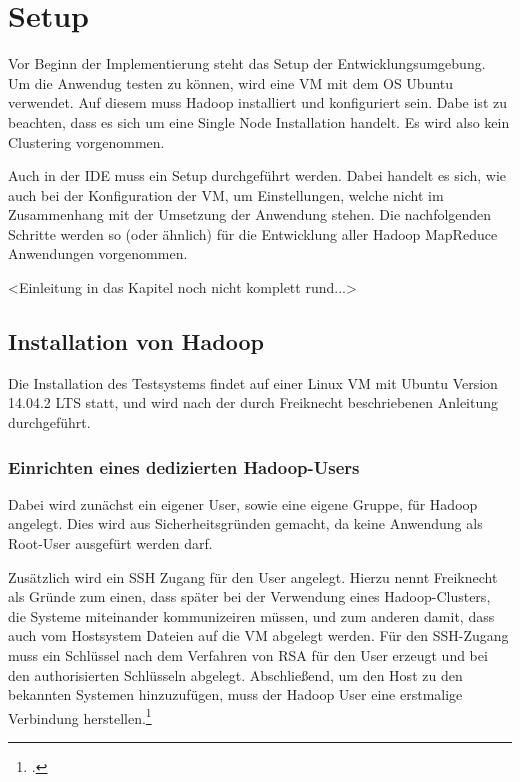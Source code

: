 
\chapter{Setup}\label{cha:Setup}
Vor Beginn der Implementierung steht das Setup der Entwicklungsumgebung. Um die Anwendug testen zu können, wird eine \ac{VM} mit dem \ac{OS} Ubuntu verwendet. Auf diesem muss Hadoop installiert und konfiguriert sein. Dabe ist zu beachten, dass es sich um eine Single Node Installation handelt. Es wird also kein Clustering vorgenommen.

Auch in der \ac{IDE} muss ein Setup durchgeführt werden. Dabei handelt es sich, wie auch bei der Konfiguration der \ac{VM}, um Einstellungen, welche nicht im Zusammenhang mit der Umsetzung der Anwendung stehen. Die nachfolgenden Schritte werden so (oder ähnlich) für die Entwicklung aller Hadoop MapReduce Anwendungen vorgenommen.

<Einleitung in das Kapitel noch nicht komplett rund...>

\section{Installation von Hadoop}\label{sec:InstallationHadoop}
Die Installation des Testsystems findet auf einer Linux \ac{VM} mit Ubuntu Version 14.04.2 \ac{LTS} statt, und wird nach der durch Freiknecht beschriebenen Anleitung durchgeführt. 

\subsection{Einrichten eines dedizierten Hadoop-Users}
Dabei wird zunächst ein eigener User, sowie eine eigene Gruppe, für Hadoop angelegt. Dies wird aus Sicherheitsgründen gemacht, da keine Anwendung als Root-User ausgefürt werden darf.

Zusätzlich wird ein \ac{SSH} Zugang für den User angelegt. Hierzu nennt Freiknecht als Gründe zum einen, dass später bei der Verwendung eines Hadoop-Clusters, die Systeme miteinander kommunizeiren müssen, und zum anderen damit, dass auch vom Hostsystem Dateien auf die \ac{VM} abgelegt werden. Für den \ac{SSH}-Zugang muss ein Schlüssel nach dem Verfahren von \ac{RSA} für den User erzeugt und bei den authorisierten Schlüsseln abgelegt. Abschließend, um den Host zu den bekannten Systemen hinzuzufügen, muss der Hadoop User eine erstmalige Verbindung herstellen.\footcite[Vgl.][S. 30 f.]{Freiknecht.2014}

